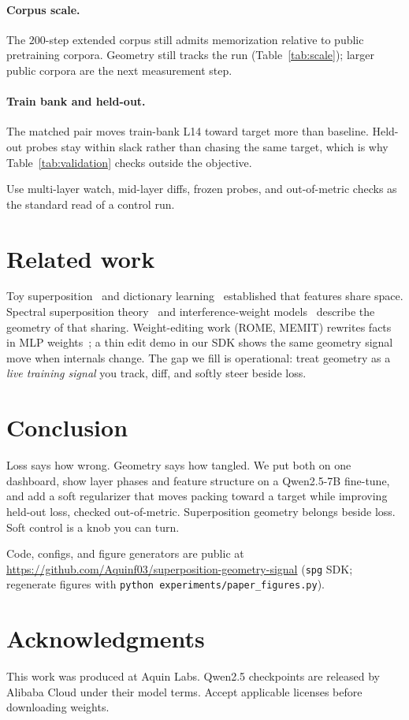 \documentclass[11pt]{article}
\begin{document}
\paragraph{Corpus scale.}
The $200$-step extended corpus still admits memorization relative to public
pretraining corpora. Geometry still tracks the run
(Table~\ref{tab:scale}); larger public corpora are the next measurement step.

\paragraph{Train bank and held-out.}
The matched pair moves train-bank L14 toward target more than baseline. Held-out
probes stay within slack rather than chasing the same target, which is why
Table~\ref{tab:validation} checks outside the objective.

Use multi-layer watch, mid-layer diffs, frozen probes, and out-of-metric
checks as the standard read of a control run.

\section{Related work}

Toy superposition~\cite{elhage2022toy} and dictionary learning~\cite{bricken2023monosemanticity}
established that features share space. Spectral superposition theory~\cite{ivanov2026spectral}
and interference-weight models~\cite{olah2025interference} describe the
geometry of that sharing. Weight-editing work (ROME, MEMIT) rewrites facts in
MLP weights~\cite{meng2022rome,meng2023memit,geva2021ffn}; a thin edit demo
in our SDK shows the same geometry signal move when internals change. The gap
we fill is operational: treat geometry as a \emph{live training signal} you
track, diff, and softly steer beside loss.

\section{Conclusion}

Loss says how wrong. Geometry says how tangled. We put both on one dashboard,
show layer phases and feature structure on a Qwen2.5-7B fine-tune, and add a
soft regularizer that moves packing toward a target while improving held-out
loss, checked out-of-metric. Superposition geometry belongs beside loss. Soft
control is a knob you can turn.

Code, configs, and figure generators are public at
\url{https://github.com/Aquinf03/superposition-geometry-signal}
(\texttt{spg} SDK; regenerate figures with
\texttt{python experiments/paper\_figures.py}).

\section*{Acknowledgments}
This work was produced at Aquin Labs. Qwen2.5 checkpoints are released by
Alibaba Cloud under their model terms. Accept applicable licenses before
downloading weights.



\end{document}
